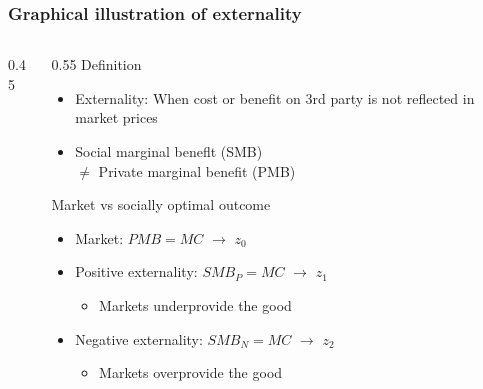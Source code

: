 \documentclass[aspectratio=169]{beamer}
\begin{document}
\begin{frame}
\frametitle{Graphical illustration of externality} 
\begin{columns}
\begin{column}{0.45\textwidth}
\end{column}
\begin{column}{0.55\textwidth}
Definition
\begin{itemize}\setlength\itemsep{3pt}
\item Externality: When cost or benefit on 3rd party is not reflected in market prices
\item Social marginal beneflt (SMB)\\ $\neq$ Private marginal benefit (PMB)
\end{itemize}\bigskip

Market vs socially optimal outcome
\begin{itemize}\setlength\itemsep{3pt}
\item Market: $PMB=MC$ $\to$ $z_0$
\item Positive externality: $SMB_P=MC$ $\to$  $z_1$
\begin{itemize}
  \item Markets underprovide the good
\end{itemize}
\item Negative externality: $SMB_N=MC$ $\to$  $z_2$
\begin{itemize}
  \item Markets overprovide the good
\end{itemize}
\end{itemize}
\end{column}
\end{columns}
\end{frame}
\end{document}
